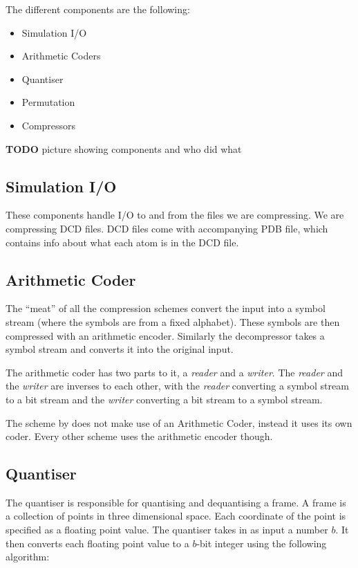 \documentclass{report}
\newcommand{\todo}{\textbf{TODO} }
\begin{document}
The different components are the following:
\begin{itemize}
\item Simulation I/O
\item Arithmetic Coders
\item Quantiser
\item Permutation
\item Compressors
\end{itemize}

\todo picture showing components and who did what


\subsection{Simulation I/O}

These components handle I/O to and from the files we are compressing. We are
compressing DCD files. DCD files come with accompanying PDB file, which
contains info about what each atom is in the DCD file.


\subsection{Arithmetic Coder}

The ``meat'' of all the compression schemes convert the input into a symbol
stream (where the symbols are from a fixed alphabet). These symbols are then
compressed with an arithmetic encoder. Similarly the decompressor takes a
symbol stream and converts it into the original input.

The arithmetic coder has two parts to it, a \emph{reader} and a
\emph{writer}. The \emph{reader} and the \emph{writer} are inverses to each
other, with the \emph{reader} converting a symbol stream to a bit stream and
the \emph{writer} converting a bit stream to a symbol stream.

The scheme by \citet{omeltchenko2000sls} does not make use of an Arithmetic
Coder, instead it uses its own coder. Every other scheme uses the arithmetic
encoder though.


\subsection{Quantiser}

The quantiser is responsible for quantising and dequantising a frame. A frame
is a collection of points in three dimensional space. Each coordinate of the
point is specified as a floating point value. The quantiser takes in as input
a number $b$. It then converts each floating point value to a $b$-bit integer
using the following algorithm:
\end{document}
